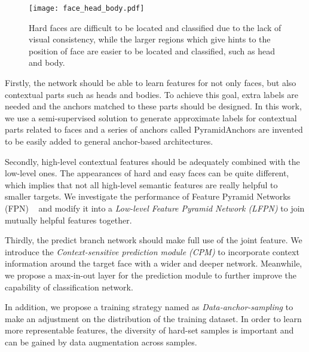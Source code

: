 \documentclass[runningheads]{llncs}
\begin{document}
\begin{figure}[h]
\centering
\texttt{[image: face\_head\_body.pdf]}
\caption{Hard faces are difficult to be located and classified due to the lack of visual consistency, while the larger regions which give hints to the position of face are easier to be located and classified, such as head and body.}
\label{fig:context_of_face}
\end{figure}

Firstly, the network should be able to learn features for not only faces, but also contextual parts such as heads and bodies. To achieve this goal, extra labels
are needed and the anchors matched to these parts should be designed. In this work, we use a semi-supervised solution to generate approximate labels for contextual
parts related to faces and a series of anchors called PyramidAnchors are invented to be easily added to general anchor-based architectures.

Secondly, high-level contextual features should be adequately combined with the low-level ones. The appearances of hard and easy faces can be quite different, which implies that
not all high-level semantic features are really helpful to smaller targets. We investigate the performance of
Feature Pyramid Networks (FPN) ~\cite{Lin2017} and modify it into a \emph{Low-level Feature Pyramid
Network (LFPN)} to join mutually helpful features together.

Thirdly, the predict branch network should make full use of the joint feature. We introduce the \emph{Context-sensitive prediction module (CPM)} to incorporate
context information around the target face with a wider and deeper network. Meanwhile, we propose a max-in-out layer for the prediction module to further improve the
capability of classification network.

In addition, we propose a training strategy named as \emph{Data-anchor-sampling} to make an adjustment on
the distribution of the training dataset. In order to learn more representable features, the diversity of hard-set samples is important and can be gained by data augmentation across samples.
\end{document}
